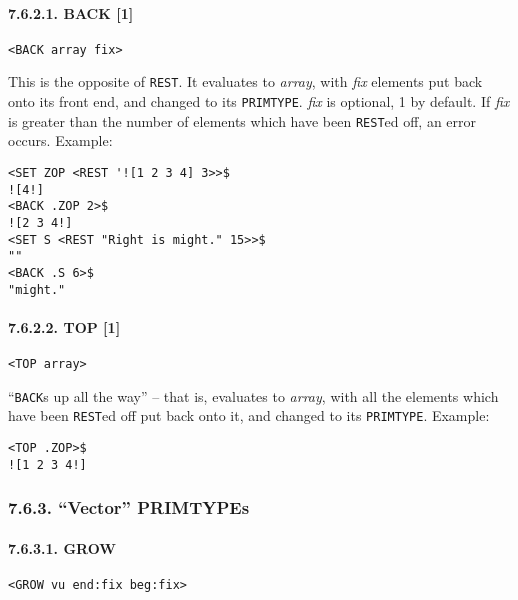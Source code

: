 \documentclass[a4paper,]{article}
\let\oldparagraph\paragraph
\renewcommand{\paragraph}[1]{\oldparagraph{#1}\mbox{}}
\begin{document}
\paragraph{7.6.2.1. BACK {[}1{]}}\label{back-1}

\begin{verbatim}
<BACK array fix>
\end{verbatim}

 This is the opposite of \texttt{REST}. It evaluates to \emph{array}, with \emph{fix} elements
put back onto its front end, and changed to its \texttt{PRIMTYPE}. \emph{fix} is optional, 1 by default. If \emph{fix} is
greater than the number of elements which have been \texttt{REST}ed off, an error occurs. Example:

\begin{verbatim}
<SET ZOP <REST '![1 2 3 4] 3>>$
![4!]
<BACK .ZOP 2>$
![2 3 4!]
<SET S <REST "Right is might." 15>>$
""
<BACK .S 6>$
"might."
\end{verbatim}

\paragraph{7.6.2.2. TOP {[}1{]}}\label{top-1}

\begin{verbatim}
<TOP array>
\end{verbatim}

 ``\texttt{BACK}s up all the way'' -- that is, evaluates to \emph{array}, with all the elements
which have been \texttt{REST}ed off put back onto it, and changed to its \texttt{PRIMTYPE}. Example:

\begin{verbatim}
<TOP .ZOP>$
![1 2 3 4!]
\end{verbatim}

\subsubsection{\texorpdfstring{7.6.3. ``Vector'' PRIMTYPEs}{7.6.3. Vector PRIMTYPEs}}\label{vector-primtypes}

\paragraph{7.6.3.1. GROW}\label{grow}

\begin{verbatim}
<GROW vu end:fix beg:fix>
\end{verbatim}
\end{document}
